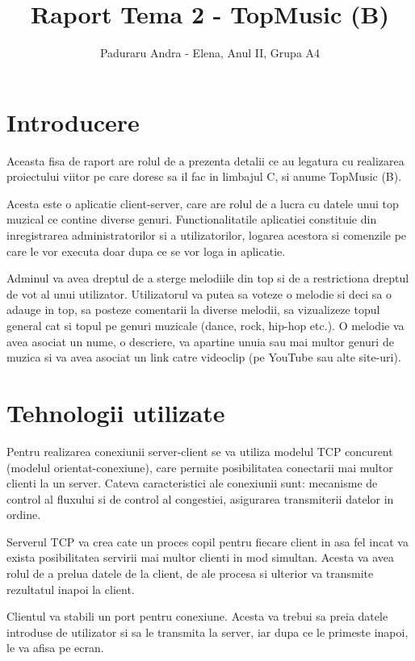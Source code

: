 \documentclass[a4paper]{article}
\title{Raport Tema 2 - TopMusic (B)}
\author{Paduraru Andra - Elena, Anul II, Grupa A4}
\date{}
\begin{document}
\maketitle

\section{Introducere}

\quad Aceasta fisa de raport are rolul de a prezenta detalii ce au legatura cu realizarea proiectului viitor pe care doresc sa il fac in limbajul C, si anume TopMusic (B). 

Acesta este o aplicatie client-server, care are rolul de a lucra cu datele unui top muzical ce contine diverse genuri. Functionalitatile aplicatiei constituie din inregistrarea administratorilor si a utilizatorilor, logarea acestora si comenzile pe care le vor executa doar dupa ce se vor loga in aplicatie. 

Adminul va avea dreptul de a sterge melodiile din top si de a restrictiona dreptul de vot al unui utilizator. Utilizatorul va putea sa voteze o melodie si deci sa o adauge in top, sa posteze comentarii la diverse melodii, sa vizualizeze topul general cat si topul pe genuri muzicale (dance, rock, hip-hop etc.). O melodie va avea asociat un nume, o descriere, va apartine unuia sau mai multor genuri de muzica si va avea asociat un link catre videoclip (pe YouTube sau alte site-uri). 

\section{Tehnologii utilizate}

\quad Pentru realizarea conexiunii server-client se va utiliza modelul TCP concurent (modelul orientat-conexiune), care permite posibilitatea conectarii mai multor clienti la un server. Cateva caracteristici ale conexiunii sunt: mecanisme de control al fluxului si de control al congestiei, asigurarea transmiterii datelor in ordine.

Serverul TCP va crea cate un proces copil pentru fiecare client in asa fel incat va exista posibilitatea servirii mai multor clienti in mod simultan. Acesta va avea rolul de a prelua datele de la client, de ale procesa si ulterior va transmite rezultatul inapoi la client.

Clientul va stabili un port pentru conexiune. Acesta va trebui sa preia datele introduse de utilizator si sa le transmita la server, iar dupa ce le primeste inapoi, le va afisa pe ecran.
\end{document}
